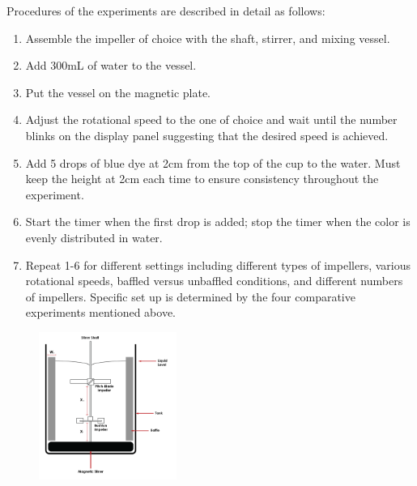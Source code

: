Procedures of the experiments are described in detail as follows: 
\begin{enumerate}
	\item Assemble the impeller of choice with the shaft, stirrer, and mixing vessel. 
	\item Add 300mL of water to the vessel. 
	\item Put the vessel on the magnetic plate. 
	\item Adjust the rotational speed to the one of choice and wait until the number blinks on the display panel suggesting that the desired speed is achieved. 
	\item Add 5 drops of blue dye at 2cm from the top of the cup to the water. Must keep the height at 2cm each time to ensure consistency throughout the experiment.  
	\item Start the timer when the first drop is added; stop the timer when the color is evenly distributed in water. 
	\item Repeat 1-6 for different settings including different types of impellers, various rotational speeds, baffled versus unbaffled conditions, and different numbers of impellers. Specific set up is determined by the four comparative experiments mentioned above.  
\end{enumerate}

\begin{figure}[h]
	\centering
	\includegraphics[width=0.4\textwidth]{Stirrer.png}
	\caption{}
\end{figure}








